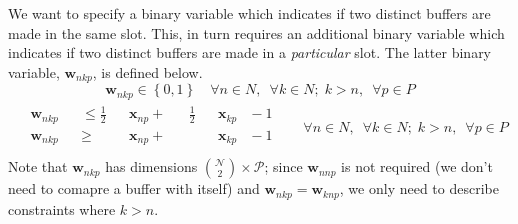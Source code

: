 We want to specify a binary variable which indicates if two distinct
buffers are made in the same slot.
This, in turn requires an additional binary variable which indicates if two
distinct buffers are made in a \emph{particular} slot.
The latter binary variable, $ \boldsymbol{w}_{nkp} $, is defined below.
\begin{equation}
    \boldsymbol{w}_{nkp} \in \left\{ 0, 1 \right\} \quad \forall n \in N, 
    \enspace \forall k \in N; \; k > n, \enspace \forall p \in P
    \label{eq.w}
\end{equation}
\begin{equation}
    \begin{split}
        \begin{alignedat}{11}
            &\boldsymbol{w}_{nkp} {}&&\le{} \tfrac{1}{2} &&\boldsymbol{x}_{np}
            {}+{} &&\tfrac{1}{2} && \boldsymbol{x}_{kp} &{}-{} 1\\
            &\boldsymbol{w}_{nkp} {}&&\ge{} &&\boldsymbol{x}_{np} {}+{} &&
            && \boldsymbol{x}_{kp} &{}-{} 1\\
        \end{alignedat}
    \end{split}
    \quad
    \begin{split}
        \forall n \in N, \enspace \forall k \in N; \; k > n, \enspace 
        \forall p \in P
    \end{split}
    \label{eq.constr6}
\end{equation}
Note that $\boldsymbol{w}_{nkp}$ has dimensions
$\binom{\mathcal{N}}{2} \times \mathcal{P}$; since $\boldsymbol{w}_{nnp}$ is
not required (we don't need to comapre a buffer with itself) and
$\boldsymbol{w}_{nkp} = \boldsymbol{w}_{knp}$, we only need to describe
constraints where $k > n$.

